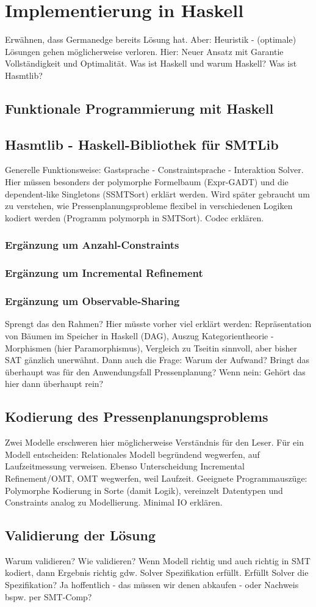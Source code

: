 \chapter{Implementierung in Haskell}
Erwähnen, dass Germanedge bereits Lösung hat.
Aber: Heuristik - (optimale) Lösungen gehen möglicherweise verloren.
Hier: Neuer Ansatz mit Garantie Vollständigkeit und Optimalität.
Was ist Haskell und warum Haskell?
Was ist Hasmtlib?

\section{Funktionale Programmierung mit Haskell}

\section{Hasmtlib - Haskell-Bibliothek für SMTLib}
Generelle Funktionsweise: Gastsprache - Constraintsprache - Interaktion Solver.
Hier müssen besonders der polymorphe Formelbaum (Expr-GADT) und die dependent-like Singletons (SSMTSort) erklärt werden.
Wird später gebraucht um zu verstehen, wie Pressenplanungsprobleme flexibel in verschiedenen Logiken kodiert werden (Programm polymorph in SMTSort).
Codec erklären.

\subsection{Ergänzung um Anzahl-Constraints}

\subsection{Ergänzung um Incremental Refinement}

\subsection{Ergänzung um Observable-Sharing}
Sprengt das den Rahmen?
Hier müsste vorher viel erklärt werden:
Repräsentation von Bäumen im Speicher in Haskell (DAG),
Auszug Kategorientheorie - Morphismen (hier Paramorphismus),
Vergleich zu Tseitin sinnvoll, aber bisher SAT gänzlich unerwähnt.
Dann auch die Frage: Warum der Aufwand?
Bringt das überhaupt was für den Anwendungsfall Pressenplanung?
Wenn nein: Gehört das hier dann überhaupt rein?

\section{Kodierung des Pressenplanungsproblems}
Zwei Modelle erschweren hier möglicherweise Verständnis für den Leser.
Für ein Modell entscheiden: Relationales Modell begründend wegwerfen, auf Laufzeitmessung verweisen.
Ebenso Unterscheidung Incremental Refinement/OMT, OMT wegwerfen, weil Laufzeit.
Geeignete Programmauszüge: Polymorphe Kodierung in Sorte (damit Logik), vereinzelt Datentypen und Constraints analog zu Modellierung.
Minimal IO erklären.

\section{Validierung der Lösung}
Warum validieren?
Wie validieren?
Wenn Modell richtig und auch richtig in SMT kodiert, dann Ergebnis richtig gdw. Solver Spezifikation erfüllt.
Erfüllt Solver die Spezifikation? Ja hoffentlich - das müssen wir denen abkaufen - oder Nachweis bspw. per SMT-Comp?